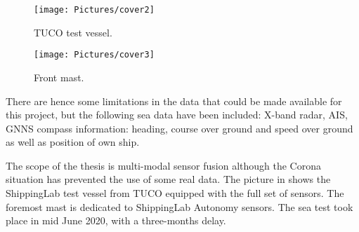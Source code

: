 \begin{figure}[h!]
	\centering
	\captionsetup{width=0.45\textwidth}
	\begin{minipage}{0.49\textwidth}
		\centering
		\texttt{[image: Pictures/cover2]}
		\caption{TUCO test vessel.}\label{fig:cover2}
	\end{minipage}
	\begin{minipage}{0.49\textwidth}
		\centering
		\texttt{[image: Pictures/cover3]}
		\caption{Front mast.}\label{fig:cover3}
	\end{minipage}
\end{figure}


There are hence some limitations in the data that could be made available for this project, but the following sea data have been included: X-band radar, AIS, GNNS compass information: heading, course over ground and speed over ground as well as position of own ship.

The scope of the thesis is multi-modal sensor fusion although the Corona situation has prevented the use of some real data. 
The picture in  shows the ShippingLab test vessel from TUCO equipped with the full set of sensors. The foremost mast is dedicated to ShippingLab Autonomy sensors. The sea test took place in mid June 2020, with a three-months delay.





%
%


